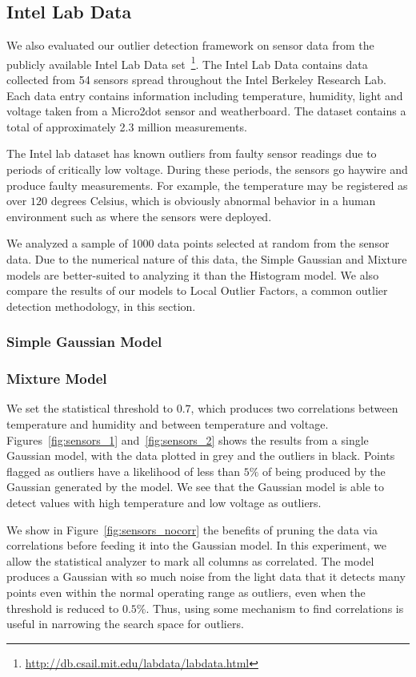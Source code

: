 \subsection{Intel Lab Data}
\label{sec:intel-lab-data-evaluation}

We also evaluated our outlier detection framework on sensor data from the publicly available Intel Lab Data set~\footnote{\url{http://db.csail.mit.edu/labdata/labdata.html}}. The Intel Lab Data contains data collected from 54 sensors spread throughout the Intel Berkeley Research Lab. Each data entry contains information including temperature, humidity, light and voltage taken from a Micro2dot sensor and weatherboard. The dataset contains a total of approximately 2.3 million measurements.

The Intel lab dataset has known outliers from faulty sensor readings due to periods of critically low voltage. During these periods, the sensors go haywire and produce faulty measurements.
For example, the temperature may be registered as over $120$ degrees Celsius, which is obviously abnormal behavior in a human environment such as where the sensors were deployed.
 
We analyzed a sample of 1000 data points selected at random from the sensor data. 
Due to the numerical nature of this data, the Simple Gaussian and Mixture models are better-suited to analyzing it than the Histogram model.
We also compare the results of our models to Local Outlier Factors, a common outlier detection methodology, in this section.
 
\subsubsection{Simple Gaussian Model}
\subsubsection{Mixture Model}
We set the statistical threshold to $0.7$, which produces two correlations between temperature and humidity and between temperature and voltage.
Figures~\ref{fig:sensors_1} and~\ref{fig:sensors_2} shows the results from a single Gaussian model, with the data plotted in grey and the outliers in black.
Points flagged as outliers have a likelihood of less than $5\%$ of being produced by the Gaussian generated by the model.
We see that the Gaussian model is able to detect values with high temperature and low voltage as outliers.
 
We show in Figure~\ref{fig:sensors_nocorr} the benefits of pruning the data via correlations before feeding it into the Gaussian model.
In this experiment, we allow the statistical analyzer to mark all columns as correlated.
The model produces a Gaussian with so much noise from the light data that it detects many points even within the normal operating range as outliers, even when the threshold is reduced to $0.5\%$. 
Thus, using some mechanism to find correlations is useful in narrowing the search space for outliers.
 
